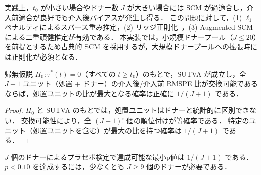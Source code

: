 \begin{remark}[有限標本バイアスと正則化]
\label{rem:regularization}
実践上，$t_0$ が小さい場合やドナー数 $J$ が大きい場合には SCM が過適合し，介入前適合が良好でも介入後バイアスが発生し得る．
この問題に対して，(1) $\ell_1$ ペナルティによるスパース重み推定，(2) リッジ正則化~\cite{amjad2018robust}，(3) Augmented SCM~\cite{benmichael2021augmented} による二重頑健推定が有効である．
本実装では，小規模ドナープール（$J \leq 20$）を前提とするため古典的 SCM を採用するが，大規模ドナープールへの拡張時には正則化が必須となる．
\end{remark}

\begin{theorem}[プラセボ検定の妥当性]
\label{thm:placebo}
帰無仮説 $H_0: \tau^*(t) = 0$（すべての $t \geq t_0$）のもとで，SUTVA が成立し，全 $J+1$ ユニット（処置 + ドナー）の介入後/介入前 RMSPE 比が交換可能であるならば，処置ユニットの比が最大となる確率は正確に $1/(J+1)$ である．
\end{theorem}

\begin{proof}
$H_0$ と SUTVA のもとでは，処置ユニットはドナーと統計的に区別できない．
交換可能性により，全 $(J+1)!$ 個の順位付けが等確率である．
特定のユニット（処置ユニットを含む）が最大の比を持つ確率は $1/(J+1)$ である．
\end{proof}

\begin{corollary}
$J$ 個のドナーによるプラセボ検定で達成可能な最小p値は $1/(J+1)$ である．
$p < 0.10$ を達成するには，少なくとも $J \geq 9$ 個のドナーが必要である．
\end{corollary}
